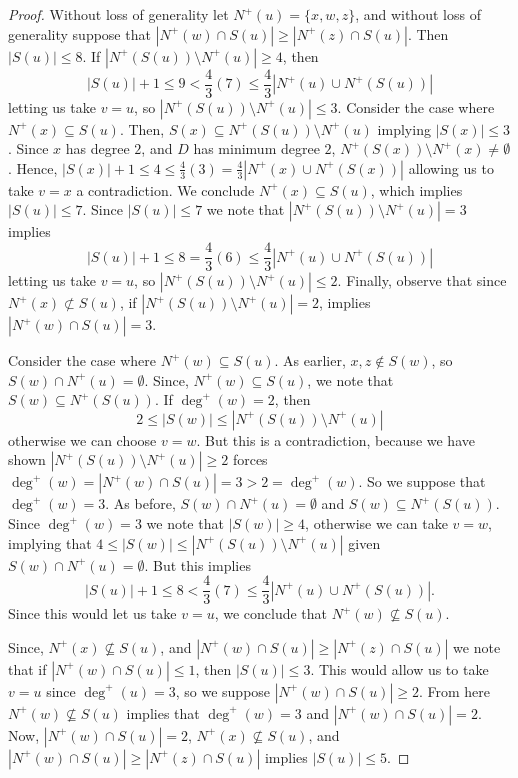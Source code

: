 \documentclass[10pt,a4paper]{amsart}
\begin{document}
\begin{proof}
    Without loss of generality let $N^+(u) = \{x,w,z\}$,
    and without loss of generality suppose that $|N^+(w)\cap S(u)|\geq |N^+(z)\cap S(u)|$.
    Then $|S(u)|\leq 8$.
    If $|N^+(S(u))\setminus N^+(u)|\geq 4$, then
    \[
    |S(u)|+1 \leq 9 < \frac{4}{3}(7) \leq \frac{4}{3}|N^+(u) \cup N^+(S(u))|
    \]
    letting us take $v = u$, so $|N^+(S(u))\setminus N^+(u)|\leq 3$.
    Consider the case where $N^+(x)\subseteq S(u)$.
    Then,  $S(x) \subseteq N^+(S(u))\setminus N^+(u)$ implying $|S(x)|\leq 3$.
    Since $x$ has degree $2$, and $D$ has minimum degree $2$, $N^+(S(x))\setminus N^+(x) \neq \emptyset$.
    Hence, 
    $|S(x)|+1 \leq 4 \leq \frac{4}{3}(3) = \frac{4}{3}|N^+(x) \cup N^+(S(x))|$
    allowing us to take $v = x$ a contradiction.
    We conclude $N^+(x)\subseteq S(u)$, which implies $|S(u)|\leq 7$.
    Since $|S(u)|\leq 7$ we note that $|N^+(S(u))\setminus N^+(u)|= 3$ implies 
    \[
    |S(u)|+1 \leq 8 = \frac{4}{3}(6) \leq \frac{4}{3}|N^+(u) \cup N^+(S(u))|
    \]
    letting us take $v = u$, so $|N^+(S(u))\setminus N^+(u)|\leq 2$.
    Finally, observe that since $N^+(x)\not\subset S(u)$, 
    if $|N^+(S(u))\setminus N^+(u)|= 2$, implies  $|N^+(w)\cap S(u)| = 3$.

    
    Consider the case where $N^+(w)\subseteq S(u)$.
    As earlier, $x,z \notin S(w)$, so $S(w) \cap N^+(u) = \emptyset$.
    Since, $N^+(w)\subseteq S(u)$, we note that $S(w)\subseteq N^+(S(u))$.
    If $\deg^+(w) = 2$, then 
    \[
    2 \leq |S(w)| \leq |N^+(S(u))\setminus N^+(u)|
    \]
    otherwise we can choose $v = w$.
    But this is a contradiction, because we have shown $|N^+(S(u))\setminus N^+(u)|\geq 2$ forces 
    $\deg^+(w) = |N^+(w)\cap S(u)| = 3> 2 = \deg^+(w)$.
    So we suppose that $\deg^+(w) = 3$.
    As before, $S(w)\cap N^+(u) = \emptyset$ and $S(w) \subseteq N^+(S(u))$.
    Since $\deg^+(w) = 3$ we note that $|S(w)|\geq 4$,
    otherwise we can take $v = w$,
    implying that
    $4 \leq |S(w)| \leq |N^+(S(u))\setminus N^+(u)|$ given $S(w) \cap N^+(u) = \emptyset$.
    But this implies 
    \[
    |S(u)| + 1 \leq 8 < \frac{4}{3}(7) \leq \frac{4}{3}|N^+(u) \cup N^+(S(u))|.
    \]
    Since this would let us take $v = u$, we conclude that $N^+(w)\not\subseteq S(u)$.

    
    Since, $N^+(x)\not\subseteq S(u)$, and 
    $|N^+(w)\cap S(u)|\geq |N^+(z)\cap S(u)|$ we note that if $|N^+(w)\cap S(u)|\leq 1$, then $|S(u)|\leq 3$.
    This would allow us to take $v = u$ since $\deg^+(u) = 3$,
    so we suppose $|N^+(w)\cap S(u)|\geq 2$.
    From here $N^+(w)\not\subseteq S(u)$ implies that $\deg^+(w) = 3$ and $|N^+(w)\cap S(u)|= 2$.
    Now, $|N^+(w)\cap S(u)|= 2$, $N^+(x)\not\subseteq S(u)$, and 
    $|N^+(w)\cap S(u)|\geq |N^+(z)\cap S(u)|$ implies $|S(u)|\leq 5$.


\end{proof}
\end{document}
